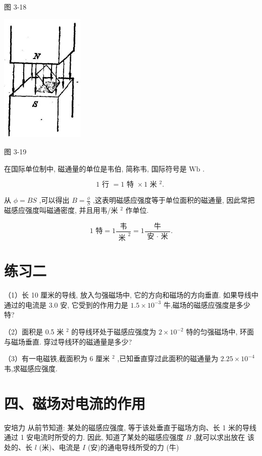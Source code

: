 \documentclass[10pt]{article}
\begin{document}
图 3-18

\begin{center}
\includegraphics[max width=0.3\textwidth]{images/01913056-1f15-74d8-9184-9aab52c9d66b_113_997764.jpg}
\end{center}

图 3-19

在国际单位制中, 磁通量的单位是韦伯, 简称韦, 国际符号是 \(\mathrm{{Wb}}\) .

\[
1\text{ 行 } = 1\text{ 特 } \times 1\text{ 米 }{}^{2}\text{. }
\]

从 \(\phi = {BS}\) ,可以得出 \(B = \frac{\phi }{S}\) ,这表明磁感应强度等于单位面积的磁通量, 因此常把磁感应强度叫磁通密度, 并且用韦/米 \({}^{2}\) 作单位.

\[
\text{1 特} = 1\frac{\text{ 韦 }}{{\text{ 米 }}^{2}} = 1\frac{\text{ 牛 }}{\text{ 安 } \cdot \text{ 米 }}\text{.}
\]

\section*{练习二}

（1）长 10 厘米的导线, 放入匀强磁场中, 它的方向和磁场的方向垂直. 如果导线中通过的电流是 3.0 安, 它受到的作用力是 \({1.5} \times {10}^{-3}\) 牛,磁场的磁感应强度是多少特?

（2）面积是 0.5 米 \({}^{2}\) 的导线环处于磁感应强度为 \(2 \times {10}^{-2}\) 特的匀强磁场中, 环面与磁场垂直. 穿过导线环的磁通量是多少?

（3）有一电磁铁,截面积为 6 厘米 \({}^{2}\) ,已知垂直穿过此面积的磁通量为 \({2.25} \times {10}^{-4}\) 韦,求磁感应强度.

\section*{四、磁场对电流的作用}

安培力 从前节知道: 某处的磁感应强度, 等于该处垂直于磁场方向、长 1 米的导线通过 1 安电流时所受的力. 因此, 知道了某处的磁感应强度 \(B\) ,就可以求出放在 该处的、长 \(l\) (米)、电流是 \(I\) (安)的通电导线所受的力 (牛)
\end{document}
